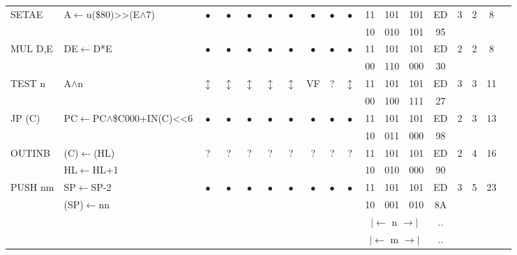 \documentclass[oneside,a4paper]{book}
\newcommand{\instrt}{\rule{0pt}{2.7ex}}
\newcommand{\instrb}{\rule[-1.7ex]{0pt}{0pt}}
\begin{document}
{\begin{tabular}{llcccccccccccccccl}
		SETAE\instrt & 
			A$\leftarrow$u(\$80)>>(E$\wedge$7)\footnotemark[1] & 
			$\bullet$ & 
				$\bullet$ & 
				$\bullet$ & 
				$\bullet$ & 
				$\bullet$ & 
				$\bullet$ & 
				$\bullet$ & 
				$\bullet$ &
			11 & 101 & 101 & 
			ED & 3 &
			2 & 8 & \\
			\multicolumn{10}{c}{} & 10 & 010 & 101 & 95 & \instrb \\

		MUL D,E\instrt & 
			DE$\leftarrow$D*E & 
			$\bullet$ & 
				$\bullet$ & 
				$\bullet$ & 
				$\bullet$ & 
				$\bullet$ & 
				$\bullet$ & 
				$\bullet$ & 
				$\bullet$ &
			11 & 101 & 101 & 
			ED & 2 &
			2 & 8 & \\
			\multicolumn{10}{c}{} & 00 & 110 & 000 & 30 & \instrb \\

		TEST n\instrt & 
			A$\wedge$n & 
			$\updownarrow$ & 
				$\updownarrow$ & 
				$\updownarrow$ & 
				$\updownarrow$ & 
				$\updownarrow$ & 
				VF & 
				? & 
				$\updownarrow$ & 
			11 & 101 & 101 & 
			ED & 3 &
			3 & 11 & \\
			\multicolumn{10}{c}{} & 00 & 100 & 111 & 27 & \instrb \\

		JP (C)\instrt & 
			PC$\leftarrow$PC$\wedge$\$C000+IN(C)<<6 & 
			$\bullet$ & 
				$\bullet$ & 
				$\bullet$ & 
				$\bullet$ & 
				$\bullet$ & 
				$\bullet$ & 
				$\bullet$ & 
				$\bullet$ &
			11 & 101 & 101 & 
			ED & 2 & 
			3 & 13 & \\
			\multicolumn{10}{c}{} & 10 & 011 & 000 & 98 & \instrb \\
			
		OUTINB\instrt & 
			(C)$\leftarrow$(HL) & 
			? & 
				? & 
				? & 
				? & 
				? & 
				? & 
				? & 
				? & 
			11 & 101 & 101 & 
			ED & 2 & 
			4 & 16 & \\
			& HL$\leftarrow$HL+1 & \multicolumn{8}{c}{} & 10 & 010 & 000 & 90 & \instrb \\

		PUSH nm\instrt\footnotemark[2] & 
			SP$\leftarrow$SP-2 & 
			$\bullet$ & 
				$\bullet$ & 
				$\bullet$ & 
				$\bullet$ & 
				$\bullet$ & 
				$\bullet$ & 
				$\bullet$ & 
				$\bullet$ &
			11 & 101 & 101 & 
			ED & 3 &
			5 & 23 & \\
			& (SP)$\leftarrow$nn & \multicolumn{8}{c}{} & 10 & 001 & 010 & 8A & \\
			\multicolumn{10}{c}{} & \multicolumn{3}{c}{$|\longleftarrow$ n $\longrightarrow|$} & .. & \\
			\multicolumn{10}{c}{} & \multicolumn{3}{c}{$|\longleftarrow$ m $\longrightarrow|$} & .. & \instrb \\
	

\end{tabular}}
\end{document}
